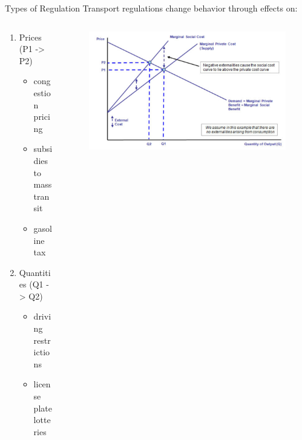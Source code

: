 \documentclass[newPxFont]{beamer}
\begin{document}
\begin{frame}[c]{Types of Regulation}
	Transport regulations change behavior through effects on:
	\begin{columns}
		\begin{column}{.5\linewidth}
	\begin{enumerate}  
		\item{Prices (P1 -> P2)}
		\begin{itemize} 
			\item{congestion pricing} 
			\item{subsidies to mass transit}
			\item{gasoline tax} 
		\end{itemize}
		\item{Quantities (Q1 -> Q2)}
		\begin{itemize} 
			\item{driving restrictions} 
			\item{license plate lotteries}
		\end{itemize}
	\end{enumerate}
		\end{column}
		
		\begin{column}{.5\linewidth}
	\begin{figure}
		\centering
		\includegraphics[width=1.0\linewidth]{P_QGraph.png}
	\end{figure}  
		\end{column}
	\end{columns}
\end{frame}
\end{document}
